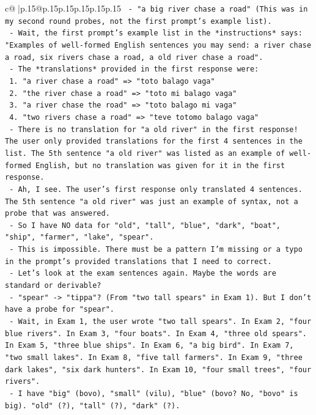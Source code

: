 \documentclass{article}
\begin{document}
{\begin{supertabular}{c@{$\;$}|p{.15\linewidth}@{}p{.15\linewidth}p{.15\linewidth}p{.15\linewidth}p{.15\linewidth}p{.15\linewidth}}
{{{\texttt{  {-} "a big river chase a road" (This was in my second round probes, not the first prompt's example list).} \\
\texttt{  {-} Wait, the first prompt's example list in the *instructions* says: "Examples of well{-}formed English sentences you may send: a river chase a road, six rivers chase a road, a old river chase a road".} \\
\texttt{  {-} The *translations* provided in the first response were:} \\
\texttt{    1. "a river chase a road" => "toto balago vaga"} \\
\texttt{    2. "the river chase a road" => "toto mi balago vaga"} \\
\texttt{    3. "a river chase the road" => "toto balago mi vaga"} \\
\texttt{    4. "two rivers chase a road" => "teve totomo balago vaga"} \\
\texttt{  {-} There is no translation for "a old river" in the first response! The user only provided translations for the first 4 sentences in the list. The 5th sentence "a old river" was listed as an example of well{-}formed English, but no translation was given for it in the first response.} \\
\texttt{  {-} Ah, I see. The user's first response only translated 4 sentences. The 5th sentence "a old river" was just an example of syntax, not a probe that was answered.} \\
\texttt{  {-} So I have NO data for "old", "tall", "blue", "dark", "boat", "ship", "farmer", "lake", "spear".} \\
\texttt{  {-} This is impossible. There must be a pattern I'm missing or a typo in the prompt's provided translations that I need to correct.} \\
\texttt{  {-} Let's look at the exam sentences again. Maybe the words are standard or derivable?} \\
\texttt{  {-} "spear" {-}> "tippa"? (From "two tall spears" in Exam 1). But I don't have a probe for "spear".} \\
\texttt{  {-} Wait, in Exam 1, the user wrote "two tall spears". In Exam 2, "four blue rivers". In Exam 3, "four boats". In Exam 4, "three old spears". In Exam 5, "three blue ships". In Exam 6, "a big bird". In Exam 7, "two small lakes". In Exam 8, "five tall farmers". In Exam 9, "three dark lakes", "six dark hunters". In Exam 10, "four small trees", "four rivers".} \\
\texttt{  {-} I have "big" (bovo), "small" (vilu), "blue" (bovo? No, "bovo" is big). "old" (?), "tall" (?), "dark" (?).} \\
}}}
\end{supertabular}}
\end{document}

